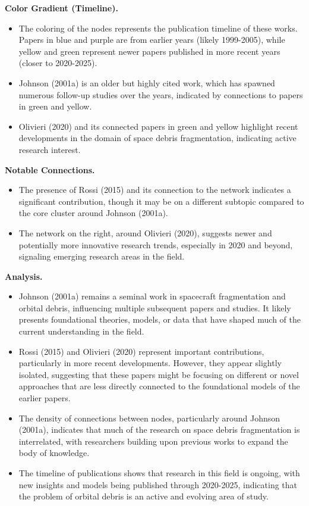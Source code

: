 \documentclass[journal ]{new-aiaa}
\begin{document}
\textbf{Color Gradient (Timeline).}

\begin{itemize}
    \item The coloring of the nodes represents the publication timeline of these works. Papers in blue and purple are from earlier years (likely 1999-2005), while yellow and green represent newer papers published in more recent years (closer to 2020-2025).
    \item Johnson (2001a) is an older but highly cited work, which has spawned numerous follow-up studies over the years, indicated by connections to papers in green and yellow.
    \item Olivieri (2020) and its connected papers in green and yellow highlight recent developments in the domain of space debris fragmentation, indicating active research interest.
\end{itemize}

\textbf{Notable Connections.}

\begin{itemize}
    \item The presence of Rossi (2015) and its connection to the network indicates a significant contribution, though it may be on a different subtopic compared to the core cluster around Johnson (2001a).
    \item The network on the right, around Olivieri (2020), suggests newer and potentially more innovative research trends, especially in 2020 and beyond, signaling emerging research areas in the field.
\end{itemize}

\textbf{Analysis.}
\begin{itemize}
    \item Johnson (2001a) remains a seminal work in spacecraft fragmentation and orbital debris, influencing multiple subsequent papers and studies. It likely presents foundational theories, models, or data that have shaped much of the current understanding in the field.
    \item Rossi (2015) and Olivieri (2020) represent important contributions, particularly in more recent developments. However, they appear slightly isolated, suggesting that these papers might be focusing on different or novel approaches that are less directly connected to the foundational models of the earlier papers.
    \item The density of connections between nodes, particularly around Johnson (2001a), indicates that much of the research on space debris fragmentation is interrelated, with researchers building upon previous works to expand the body of knowledge.
    \item The timeline of publications shows that research in this field is ongoing, with new insights and models being published through 2020-2025, indicating that the problem of orbital debris is an active and evolving area of study.
\end{itemize}
\end{document}
